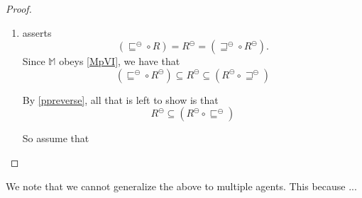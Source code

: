 \begin{proof}
\begin{enumerate}[label=\textup{(\emph{\Roman*})$'$}, topsep=0.0in,
  parsep=0.075in]
\item asserts 
$$(\sqsubseteq^\ominus \circ R) = R^\ominus =
    (\sqsupseteq^\ominus \circ R^\ominus).$$
Since $\mathbb{M}$ obeys \ref{MpVI}, we have that 
\[ ( \sqsubseteq^{\ominus} \circ R^{\ominus}) \subseteq
    R^{\ominus} \subseteq (R^{\ominus} \circ \sqsupseteq^{\ominus})\]

By \ref{ppreverse}, all that is left to show is that 
\[ R^{\ominus} \subseteq (R^{\ominus} \circ \sqsubseteq^{\ominus}) \]

So assume that 

\end{enumerate}

\end{proof}

We note that we cannot generalize the above to multiple agents.  This
because ...

